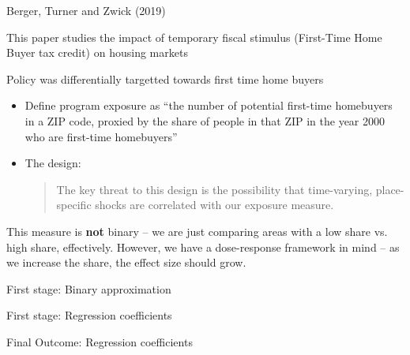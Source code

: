 \documentclass[notes,11pt, aspectratio=169]{beamer}
\newenvironment{wideitemize}{\itemize\addtolength{\itemsep}{10pt}}{\enditemize}
\begin{document}
\begin{frame}{Berger, Turner and Zwick (2019)}
  \begin{wideitemize}
  \item This paper studies the impact of temporary fiscal stimulus
    (First-Time Home Buyer tax credit) on housing markets
  \item Policy was differentially targetted towards first time home buyers
    \begin{itemize}
    \item Define program exposure as ``the number of potential
      first-time homebuyers in a ZIP code, proxied by the share of
      people in that ZIP in the year 2000 who are first-time
      homebuyers''
    \item The design:
      \begin{quote}
        The key threat to this design is the possibility that
        time-varying, place-specific shocks are correlated with our
        exposure measure.
      \end{quote}
    \end{itemize}
  \item This measure is \textbf{not} binary -- we are just comparing
    areas with a low share vs. high share, effectively. However, we
    have a dose-response framework in mind -- as we increase the
    share, the effect size should grow.
  \end{wideitemize}
\end{frame}

\begin{frame}{First stage: Binary approximation}
\end{frame}
\begin{frame}{First stage: Regression coefficients}
\end{frame}
\begin{frame}{Final Outcome: Regression coefficients}
\end{frame}
\end{document}
